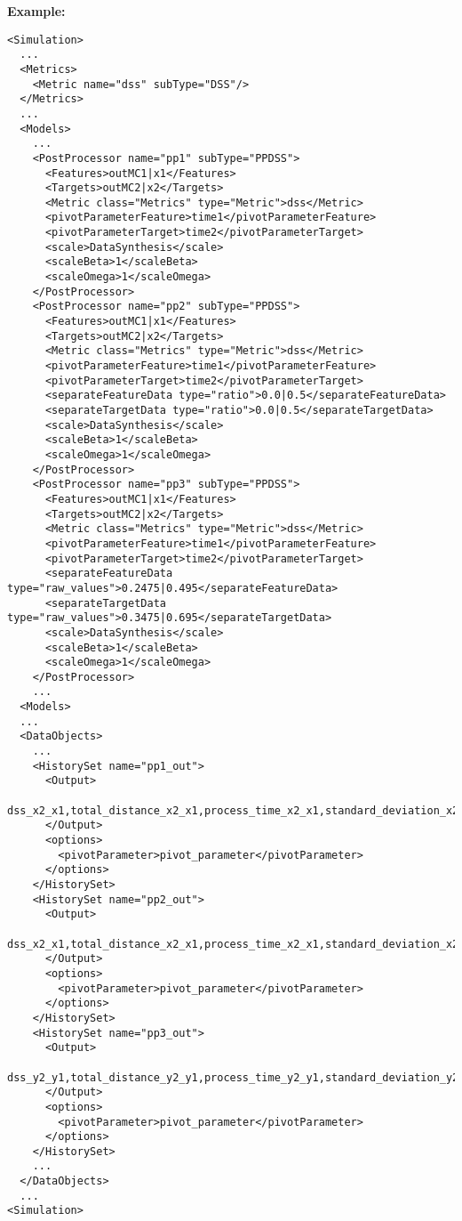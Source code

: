 \textbf{Example:}
\begin{lstlisting}[style=XML,morekeywords={subType}]
<Simulation>
  ...
  <Metrics>
    <Metric name="dss" subType="DSS"/>
  </Metrics>
  ...
  <Models>
    ...
    <PostProcessor name="pp1" subType="PPDSS">
      <Features>outMC1|x1</Features>
      <Targets>outMC2|x2</Targets>
      <Metric class="Metrics" type="Metric">dss</Metric>
      <pivotParameterFeature>time1</pivotParameterFeature>
      <pivotParameterTarget>time2</pivotParameterTarget>
      <scale>DataSynthesis</scale>
      <scaleBeta>1</scaleBeta>
      <scaleOmega>1</scaleOmega>
    </PostProcessor>
    <PostProcessor name="pp2" subType="PPDSS">
      <Features>outMC1|x1</Features>
      <Targets>outMC2|x2</Targets>
      <Metric class="Metrics" type="Metric">dss</Metric>
      <pivotParameterFeature>time1</pivotParameterFeature>
      <pivotParameterTarget>time2</pivotParameterTarget>
      <separateFeatureData type="ratio">0.0|0.5</separateFeatureData>
      <separateTargetData type="ratio">0.0|0.5</separateTargetData>
      <scale>DataSynthesis</scale>
      <scaleBeta>1</scaleBeta>
      <scaleOmega>1</scaleOmega>
    </PostProcessor>
    <PostProcessor name="pp3" subType="PPDSS">
      <Features>outMC1|x1</Features>
      <Targets>outMC2|x2</Targets>
      <Metric class="Metrics" type="Metric">dss</Metric>
      <pivotParameterFeature>time1</pivotParameterFeature>
      <pivotParameterTarget>time2</pivotParameterTarget>
      <separateFeatureData type="raw_values">0.2475|0.495</separateFeatureData>
      <separateTargetData type="raw_values">0.3475|0.695</separateTargetData>
      <scale>DataSynthesis</scale>
      <scaleBeta>1</scaleBeta>
      <scaleOmega>1</scaleOmega>
    </PostProcessor>
    ...
  <Models>
  ...
  <DataObjects>
    ...
    <HistorySet name="pp1_out">
      <Output>
          dss_x2_x1,total_distance_x2_x1,process_time_x2_x1,standard_deviation_x2_x1
      </Output>
      <options>
        <pivotParameter>pivot_parameter</pivotParameter>
      </options>
    </HistorySet>
    <HistorySet name="pp2_out">
      <Output>
          dss_x2_x1,total_distance_x2_x1,process_time_x2_x1,standard_deviation_x2_x1
      </Output>
      <options>
        <pivotParameter>pivot_parameter</pivotParameter>
      </options>
    </HistorySet>
    <HistorySet name="pp3_out">
      <Output>
          dss_y2_y1,total_distance_y2_y1,process_time_y2_y1,standard_deviation_y2_y1
      </Output>
      <options>
        <pivotParameter>pivot_parameter</pivotParameter>
      </options>
    </HistorySet>
    ...
  </DataObjects>
  ...
<Simulation>
\end{lstlisting}


